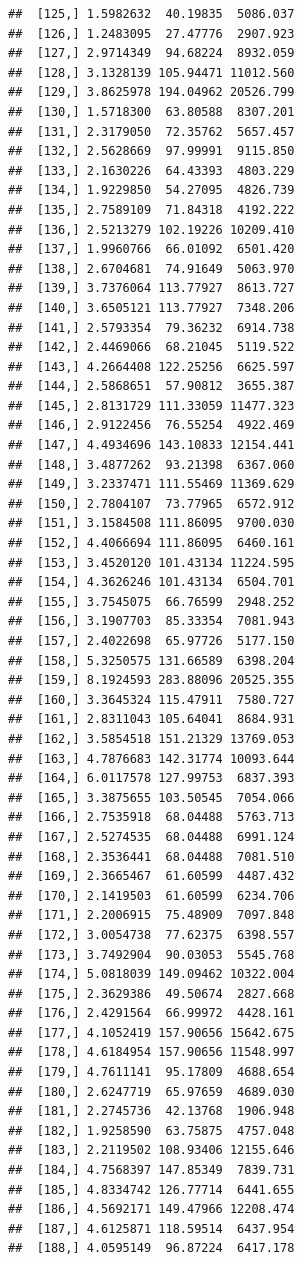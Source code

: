 \documentclass[article]{jss}\usepackage[]{graphicx}\usepackage[]{xcolor}
\makeatletter
\newenvironment{kframe}{%
 \def\at@end@of@kframe{}%
 \ifinner\ifhmode%
  \def\at@end@of@kframe{\end{minipage}}%
  \begin{minipage}{\columnwidth}%
 \fi\fi%
 \def\FrameCommand##1{\hskip\@totalleftmargin \hskip-\fboxsep
 \colorbox{shadecolor}{##1}\hskip-\fboxsep
     \hskip-\linewidth \hskip-\@totalleftmargin \hskip\columnwidth}%
 \MakeFramed {\advance\hsize-\width
   \@totalleftmargin\z@ \linewidth\hsize
   \@setminipage}}%
 {\par\unskip\endMakeFramed%
 \at@end@of@kframe}
\newenvironment{knitrout}{}{} %
\makeatother
\begin{document}
\begin{knitrout}
\begin{kframe}
\begin{verbatim}
##  [125,] 1.5982632  40.19835  5086.037
##  [126,] 1.2483095  27.47776  2907.923
##  [127,] 2.9714349  94.68224  8932.059
##  [128,] 3.1328139 105.94471 11012.560
##  [129,] 3.8625978 194.04962 20526.799
##  [130,] 1.5718300  63.80588  8307.201
##  [131,] 2.3179050  72.35762  5657.457
##  [132,] 2.5628669  97.99991  9115.850
##  [133,] 2.1630226  64.43393  4803.229
##  [134,] 1.9229850  54.27095  4826.739
##  [135,] 2.7589109  71.84318  4192.222
##  [136,] 2.5213279 102.19226 10209.410
##  [137,] 1.9960766  66.01092  6501.420
##  [138,] 2.6704681  74.91649  5063.970
##  [139,] 3.7376064 113.77927  8613.727
##  [140,] 3.6505121 113.77927  7348.206
##  [141,] 2.5793354  79.36232  6914.738
##  [142,] 2.4469066  68.21045  5119.522
##  [143,] 4.2664408 122.25256  6625.597
##  [144,] 2.5868651  57.90812  3655.387
##  [145,] 2.8131729 111.33059 11477.323
##  [146,] 2.9122456  76.55254  4922.469
##  [147,] 4.4934696 143.10833 12154.441
##  [148,] 3.4877262  93.21398  6367.060
##  [149,] 3.2337471 111.55469 11369.629
##  [150,] 2.7804107  73.77965  6572.912
##  [151,] 3.1584508 111.86095  9700.030
##  [152,] 4.4066694 111.86095  6460.161
##  [153,] 3.4520120 101.43134 11224.595
##  [154,] 4.3626246 101.43134  6504.701
##  [155,] 3.7545075  66.76599  2948.252
##  [156,] 3.1907703  85.33354  7081.943
##  [157,] 2.4022698  65.97726  5177.150
##  [158,] 5.3250575 131.66589  6398.204
##  [159,] 8.1924593 283.88096 20525.355
##  [160,] 3.3645324 115.47911  7580.727
##  [161,] 2.8311043 105.64041  8684.931
##  [162,] 3.5854518 151.21329 13769.053
##  [163,] 4.7876683 142.31774 10093.644
##  [164,] 6.0117578 127.99753  6837.393
##  [165,] 3.3875655 103.50545  7054.066
##  [166,] 2.7535918  68.04488  5763.713
##  [167,] 2.5274535  68.04488  6991.124
##  [168,] 2.3536441  68.04488  7081.510
##  [169,] 2.3665467  61.60599  4487.432
##  [170,] 2.1419503  61.60599  6234.706
##  [171,] 2.2006915  75.48909  7097.848
##  [172,] 3.0054738  77.62375  6398.557
##  [173,] 3.7492904  90.03053  5545.768
##  [174,] 5.0818039 149.09462 10322.004
##  [175,] 2.3629386  49.50674  2827.668
##  [176,] 2.4291564  66.99972  4428.161
##  [177,] 4.1052419 157.90656 15642.675
##  [178,] 4.6184954 157.90656 11548.997
##  [179,] 4.7611141  95.17809  4688.654
##  [180,] 2.6247719  65.97659  4689.030
##  [181,] 2.2745736  42.13768  1906.948
##  [182,] 1.9258590  63.75875  4757.048
##  [183,] 2.2119502 108.93406 12155.646
##  [184,] 4.7568397 147.85349  7839.731
##  [185,] 4.8334742 126.77714  6441.655
##  [186,] 4.5692171 149.47966 12208.474
##  [187,] 4.6125871 118.59514  6437.954
##  [188,] 4.0595149  96.87224  6417.178

\end{verbatim}
\end{kframe}
\end{knitrout}
\end{document}
